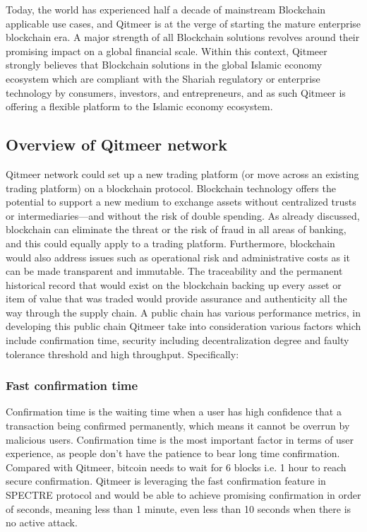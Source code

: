 \documentclass[a4paper,11pt]{article}
\begin{document}
Today, the world has experienced half a decade of mainstream Blockchain applicable use cases, and Qitmeer is at the verge of starting the mature enterprise blockchain era. A major strength of all Blockchain solutions revolves around their promising impact on a global financial scale. Within this context, Qitmeer strongly believes that Blockchain solutions in the global Islamic economy ecosystem which are compliant with the Shariah regulatory or enterprise technology by consumers, investors, and entrepreneurs, and as such Qitmeer is offering a flexible platform to the Islamic economy ecosystem.

\subsection{Overview of Qitmeer network}
Qitmeer network could set up a new trading platform (or move across an existing trading platform) on a blockchain protocol. Blockchain technology offers the potential to support a new medium to exchange assets without centralized trusts or intermediaries—and without the risk of double spending\cite{double-spend}. As already discussed, blockchain can eliminate the threat or the risk of fraud in all areas of banking, and this could equally apply to a trading platform. Furthermore, blockchain would also address issues such as operational risk and administrative costs as it can be made transparent and immutable. The traceability and the permanent historical record that would exist on the blockchain backing up every asset or item of value that was traded would provide assurance and authenticity all the way through the supply chain. A public chain has various performance metrics, in developing this public chain Qitmeer take into consideration various factors which include confirmation time, security including decentralization degree and faulty tolerance threshold and high throughput. Specifically:

\subsubsection{Fast confirmation time}

Confirmation time is the waiting time when a user has high confidence that a
transaction being confirmed permanently, which means it cannot be overrun by
malicious users. Confirmation time is the most important factor in terms of user
experience, as people don't have the patience to bear long time confirmation.
Compared with Qitmeer, bitcoin needs to wait for 6 blocks i.e. 1 hour to reach
secure confirmation. Qitmeer is leveraging the fast confirmation feature in
SPECTRE protocol and would be able to achieve promising confirmation in order of
seconds, meaning less than 1 minute, even less than 10 seconds when there is no
active attack.
\end{document}
